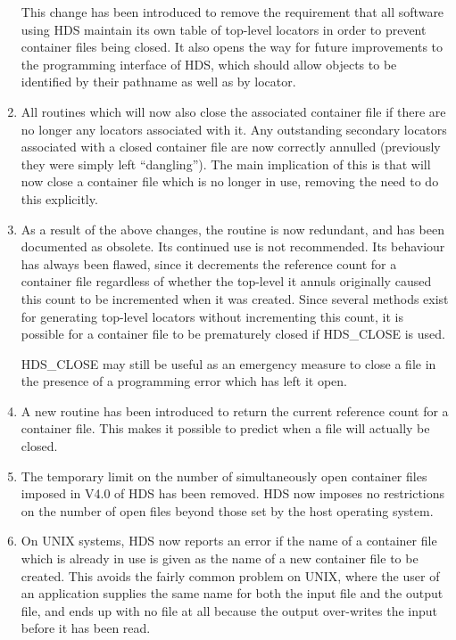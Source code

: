 \documentclass[twoside,11pt]{starlink}
\providecommand{\qt}[1]{``#1''}
\begin{document}
\begin{enumerate}
This change has been introduced to remove the requirement that all
software using HDS maintain its own table of top-level locators in
order to prevent container files being closed. It also opens the way
for future improvements to the programming interface of HDS, which
should allow objects to be identified by their pathname as well as by
locator.

\item
All routines which 
 will now also close the associated
container file if there are no longer any
 locators associated with it. Any
outstanding secondary locators associated with a closed container file
are now correctly annulled (previously they were simply left
\qt{dangling}). The main implication of this is that
 will now close a container file which
is no longer in use, removing the need to do this explicitly.

\item
As a result of the above changes, the 
routine is now redundant, and has been documented as obsolete. Its
continued use is not recommended. Its behaviour has always been
flawed, since it decrements the reference count for a container file
regardless of whether the top-level  it annuls originally
caused this count to be incremented when it was created. Since several
methods exist for generating top-level locators without incrementing
this count, it is possible for a container file to be prematurely
closed if HDS\_CLOSE is used.

HDS\_CLOSE may still be useful as an emergency measure to close a file
in the presence of a programming error which has left it open.

\item
A new routine  has been introduced to
return the current reference count for a container file. This makes it
possible to predict when a file will actually be closed.

\item
The temporary limit on the number of simultaneously open container
files imposed in V4.0 of HDS has been removed. HDS now imposes no
restrictions on the number of open files beyond those set by the host
operating system.

\item
On UNIX systems, HDS now reports an error if the name of a container
file which is already in use is given as the name of a new container
file to be created.  This avoids the fairly common problem on UNIX,
where the user of an application supplies the same name for both the
input file and the output file, and ends up with no file at all
because the output over-writes the input before it has been read.


\end{enumerate}
\end{document}
